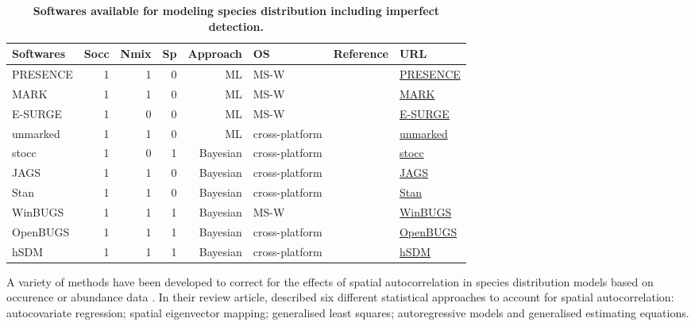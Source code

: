 \documentclass[a4paper, 12pt, leqno]{article}\usepackage[]{graphicx}\usepackage[]{color}
\begin{document}
\begin{landscape}
  \begin{table}
    \begin{center}
      \begin{longtable}{@{}lrrrrL{3cm}L{3cm}R{3cm}@{}}
        \toprule
        Softwares & Socc & Nmix & Sp & Approach & OS & Reference & URL \\
        \midrule
        PRESENCE & 1 & 1 & 0 & ML & MS-W & \citet{MacKenzie2006} & \href{http://www.mbr-pwrc.usgs.gov/software/presence.html}{PRESENCE} \\
        MARK & 1 & 1 & 0 & ML & MS-W & \citet{White1999} & \href{http://www.phidot.org/software/mark/}{MARK} \\
        E-SURGE & 1 & 0 & 0 & ML & MS-W & \citet{Choquet2009} & \href{http://www.cefe.cnrs.fr/biostatistiques-et-biologie-des-populations/logiciels}{E-SURGE} \\
        unmarked & 1 & 1 & 0 & ML & cross-platform & \citet{Fiske2011} & 
        \href{http://CRAN.R-project.org/package=unmarked}{unmarked} \\
        stocc & 1 & 0 & 1 & Bayesian & cross-platform & \citet{Johnson2013} & \href{http://CRAN.R-project.org/package=stocc}{stocc} \\
        JAGS & 1 & 1 & 0 & Bayesian & cross-platform & ~ & \href{http://mcmc-jags.sourceforge.net/}{JAGS} \\
        Stan & 1 & 1 & 0 & Bayesian & cross-platform & \citet{Stan2014} & \href{http://mc-stan.org}{Stan} \\
        WinBUGS & 1 & 1 & 1 & Bayesian & MS-W & \citet{Lunn2009} & \href{http://www.mrc-bsu.cam.ac.uk/software/bugs/the-bugs-project-winbugs/}{WinBUGS} \\
        OpenBUGS & 1 & 1 & 1 & Bayesian & cross-platform & \citet{Lunn2009} & \href{http://www.openbugs.net}{OpenBUGS}\\
        hSDM & 1 & 1 & 1 & Bayesian & cross-platform & ~ & \href{http://hSDM.sf.net}{hSDM}\\
        \bottomrule
      \end{longtable}
    \end{center}
    \caption{\textbf{Softwares available for modeling species distribution including
        imperfect detection.}}
    \label{tab:softwares-mixture} 
  \end{table}
\end{landscape}

A variety of methods have been developed to correct for the effects of spatial
autocorrelation in species distribution models based on occurence or abundance data
\citep{Cressie1993,Dormann2007,Keitt2002,Miller2007}. In their review article,
\citet{Dormann2007} described six different statistical approaches to account for spatial
autocorrelation: autocovariate regression; spatial eigenvector mapping; generalised least
squares; autoregressive models and generalised estimating equations. 
\end{document}
